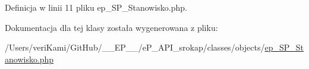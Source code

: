 Definicja w linii 11 pliku ep\-\_\-\-S\-P\-\_\-\-Stanowisko.\-php.



Dokumentacja dla tej klasy została wygenerowana z pliku\-:\begin{DoxyCompactItemize}
\item 
/\-Users/veri\-Kami/\-Git\-Hub/\-\_\-\-\_\-\-E\-P\-\_\-\-\_\-/e\-P\-\_\-\-A\-P\-I\-\_\-srokap/classes/objects/\hyperlink{ep___s_p___stanowisko_8php}{ep\-\_\-\-S\-P\-\_\-\-Stanowisko.\-php}\end{DoxyCompactItemize}
